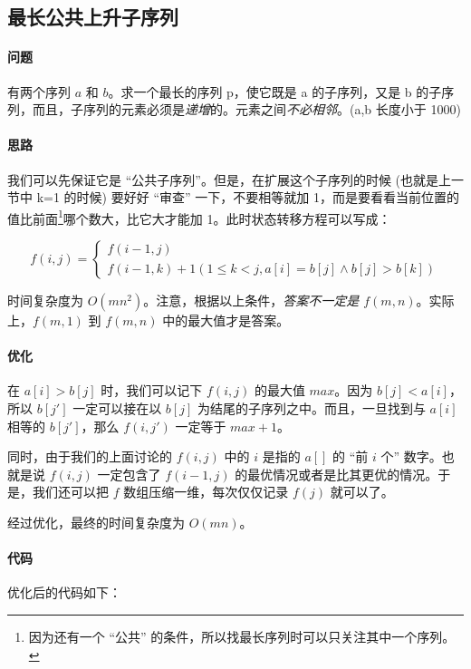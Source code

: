 \subsection{最长公共上升子序列}
	\paragraph{问题} 有两个序列 $a$ 和 $b$。求一个最长的序列 p，使它既是 a 的子序列，又是 b 的子序列，而且，子序列的元素必须是\emph{递增}的。元素之间\emph{不必相邻}。(a,b 长度小于 1000)
	
	\paragraph{思路} 我们可以先保证它是 “公共子序列”。但是，在扩展这个子序列的时候 (也就是上一节中 k=1 的时候) 要好好 “审查” 一下，不要相等就加 1，而是要看看当前位置的值比前面\footnote{因为还有一个 “公共” 的条件，所以找最长序列时可以只关注其中一个序列。}哪个数大，比它大才能加 1。此时状态转移方程可以写成：
	
	\[
		f(i,j)=\left\{{\begin{array}{l}f(i-1,j)\\f(i-1,k)+1(1\leqslant k<j,a[i]=b[j]\land b[j]>b[k])\end{array}}\right.
	\]
	
	时间复杂度为 $O(mn^{2})$。注意，根据以上条件，\emph{答案不一定是 $f(m,n)$}。实际上，$f(m,1)$ 到 $f(m,n)$ 中的最大值才是答案。
	
	\paragraph{优化} 在 $a[i]>b[j]$ 时，我们可以记下 $f(i,j)$ 的最大值 $max$。因为 $b[j]<a[i]$，所以 $b[j']$ 一定可以接在以 $b[j]$ 为结尾的子序列之中。而且，一旦找到与 $a[i]$ 相等的 $b[j']$，那么 $f(i,j')$ 一定等于 $max+1$。
	
	同时，由于我们的上面讨论的 $f(i,j)$ 中的 $i$ 是指的 $a[]$ 的 “前 $i$ 个” 数字。也就是说 $f(i,j)$ 一定包含了 $f(i-1,j)$ 的最优情况或者是比其更优的情况。于是，我们还可以把 $f$ 数组压缩一维，每次仅仅记录 $f(j)$ 就可以了。
	
	经过优化，最终的时间复杂度为 $O(mn)$。
	
	\paragraph{代码} 优化后的代码如下：
	
	